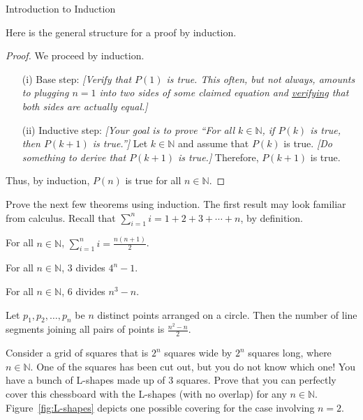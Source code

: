 \begin{section}{Introduction to Induction}
\begin{skeleton}
Here is the general structure for a proof by induction.

\begin{mdframed}[style=skeleton]
\begin{proof}
We proceed by induction.
\begin{enumerate}\setlength{\itemsep}{0in}
\item[(i)] Base step: \emph{[Verify that $P(1)$ is true. This often, but not always, amounts to plugging $n=1$ into two sides of some claimed equation and \underline{verifying} that both sides are actually equal.]}

\item[(ii)] Inductive step:  \emph{[Your goal is to prove ``For all $k\in\mathbb{N}$, if $P(k)$ is true, then $P(k+1)$ is true.'']} Let $k\in\mathbb{N}$ and assume that $P(k)$ is true. \emph{[Do something to derive that $P(k+1)$ is true.]} Therefore, $P(k+1)$ is true.
\end{enumerate}
Thus, by induction, $P(n)$ is true for all $n\in\mathbb{N}$.
\end{proof}
\end{mdframed}
\end{skeleton}

Prove the next few theorems using induction.  The first result may look familiar from calculus. Recall that $\displaystyle \sum_{i=1}^{n}i=1+2+3+\cdots +n$, by definition.

\begin{theorem}
For all $n\in\mathbb{N}$, $\displaystyle \sum_{i=1}^{n}i=\frac{n(n+1)}{2}$.
\end{theorem}

\begin{theorem}
For all $n\in\mathbb{N}$, 3 divides $4^{n}-1$.
\end{theorem}

\begin{theorem}
For all $n\in\mathbb{N}$, 6 divides $n^{3}-n$.
\end{theorem}

\begin{theorem}
Let $p_{1}, p_{2}, \ldots, p_{n}$ be $n$ distinct points arranged on a circle.  Then the number of line segments joining all pairs of points is $\frac{n^{2}-n}{2}$.
\end{theorem}

\begin{problem}\label{prob:L-shapes}
Consider a grid of squares that is $2^n$ squares wide by $2^n$ squares long, where $n\in\mathbb{N}$. One of the squares has been cut out, but you do not know which one!  You have a bunch of L-shapes made up of $3$ squares.  Prove that you can perfectly cover this chessboard with the L-shapes (with no overlap) for any $n\in\mathbb{N}$. Figure~\ref{fig:L-shapes} depicts one possible covering for the case involving $n=2$.
\end{problem}


\end{section}
